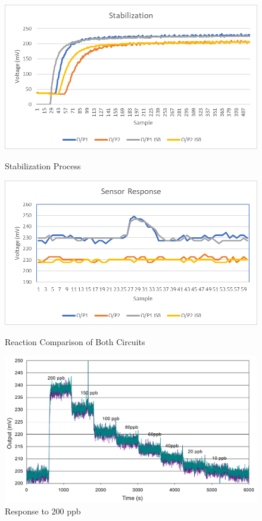 \begin{figure}
	\begin{center}
		\includegraphics[width=1\textwidth]{Pics/4}
		\caption{Stabilization Process}
		\label{fig:4.3}
		\vspace{2cm}
		\includegraphics[width=1\textwidth]{Pics/2}
		\caption{Reaction Comparison of Both Circuits}
		\label{fig:4.4}
	\end{center}
\end{figure}
\newpage
\begin{figure}
	\begin{center}
		\includegraphics[width=1\textwidth]{Pics/9}
		\caption{Response to 200 ppb  \cite{Datasheet}}
		\label{fig:4.5}
		\medskip        
	\end{center}
\end{figure}